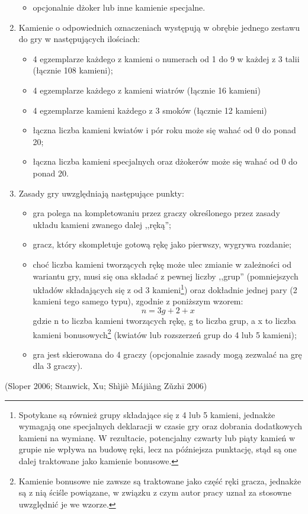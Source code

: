 \begin{enumerate}[label={\alph*)}]
\begin{itemize}
	  \item opcjonalnie dżoker lub inne kamienie specjalne.
	\end{itemize}
\item Kamienie o odpowiednich oznaczeniach występują w obrębie jednego zestawu
do gry w następujących ilościach:
	\begin{itemize}
	  \item 4 egzemplarze każdego z kamieni o numerach od 1 do 9 w każdej z 3 talii
	  (łącznie 108 kamieni);
	  \item 4 egzemplarze każdego z kamieni wiatrów (łącznie 16 kamieni)
	  \item 4 egzemplarze kamieni każdego z 3 smoków (łącznie 12 kamieni)
	  \item łączna liczba kamieni kwiatów i pór roku może się wahać od 0 do ponad
	  20;
	  \item łączna liczba kamieni specjalnych oraz dżokerów może się wahać od
	0 do ponad 20.
	\end{itemize} 
\item Zasady gry uwzględniają następujące punkty:
	\begin{itemize}
	  \item gra polega na kompletowaniu przez graczy określonego przez zasady
	  układu kamieni zwanego dalej ,,ręką'';
	  \item gracz, który skompletuje gotową rękę jako pierwszy, wygrywa rozdanie;
	  \item choć liczba kamieni tworzących rękę może ulec zmianie w zależności od
	  wariantu gry, musi się ona składać z pewnej liczby ,,grup'' (pomniejszych
	  układów składających się z od 3 kamieni\footnote{Spotykane są również grupy
	  składające się z 4 lub 5 kamieni, jednakże wymagają one specjalnych
	  deklaracji w czasie gry oraz dobrania dodatkowych kamieni na wymianę. W
	  rezultacie, potencjalny czwarty lub piąty kamień w grupie nie wpływa na
	  budowę ręki, lecz na późniejsza punktację, stąd są one dalej traktowane
	  jako kamienie bonusowe.}) oraz dokładnie jednej pary (2 kamieni tego samego
	  typu), zgodnie z poniższym wzorem:
	  \begin{equation*}
	  n = 3g + 2 + x
	  \end{equation*}
	  gdzie n to liczba kamieni tworzących rękę, g to liczba grup, a x to liczba
	  kamieni bonusowych\footnote{Kamienie bonusowe nie zawsze są traktowane jako
	  część ręki gracza, jednakże są z nią ściśle powiązane, w związku z czym
	  autor pracy uznał za stosowne uwzględnić je we wzorze.} (kwiatów lub
	  rozszerzeń grup do 4 lub 5 kamieni);
	  \item gra jest skierowana do 4 graczy (opcjonalnie zasady mogą
	  zezwalać na grę dla 3 graczy).
	\end{itemize} 
\end{enumerate}
(Sloper 2006; Stanwick, Xu; Shìjiè Májiàng Zǔzhī 2006)
